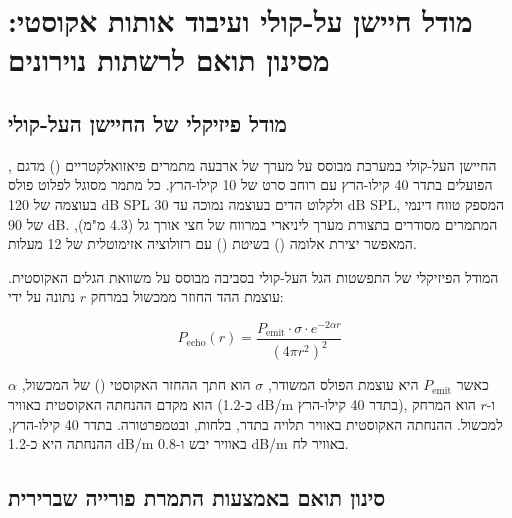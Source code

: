 

\section{מודל חיישן על-קולי ועיבוד אותות אקוסטי: מסינון תואם לרשתות נוירונים}
\label{sec:ch03_sensors}

\subsection{מודל פיזיקלי של החיישן העל-קולי}
\label{sec:ch03_physical_model}

החיישן העל-קולי במערכת מבוסס על מערך של ארבעה מתמרים פיאזואלקטריים () מדגם , הפועלים בתדר 40 קילו-הרץ עם רוחב סרט של 10 קילו-הרץ. כל מתמר מסוגל לפלוט פולס בעוצמה של 120 dB SPL ולקלוט הדים בעוצמה נמוכה עד 30 dB SPL, המספק טווח דינמי של 90 dB. המתמרים מסודרים בתצורת מערך ליניארי במרווח של חצי אורך גל (4.3 מ"מ), המאפשר יצירת אלומה () בשיטת  () עם רזולוציה אזימוטלית של 12 מעלות. \cite{CrewAIDocs}

המודל הפיזיקלי של התפשטות הגל העל-קולי בסביבה מבוסס על משוואת הגלים האקוסטית. עוצמת ההד החוזר ממכשול במרחק $r$ נתונה על ידי:

\begin{equation}
P_{\text{echo}}(r) = \frac{P_{\text{emit}} \cdot \sigma \cdot e^{-2\alpha r}}{(4\pi r^2)^2}
\label{eq:ch03_echo_power}
\end{equation}

כאשר $P_{\text{emit}}$ היא עוצמת הפולס המשודר, $\sigma$ הוא חתך ההחזר האקוסטי () של המכשול, $\alpha$ הוא מקדם ההנחתה האקוסטית באוויר (כ-1.2 dB/m בתדר 40 קילו-הרץ), ו-$r$ הוא המרחק למכשול. ההנחתה האקוסטית באוויר תלויה בתדר, בלחות, ובטמפרטורה. בתדר 40 קילו-הרץ, ההנחתה היא כ-1.2 dB/m באוויר יבש ו-0.8 dB/m באוויר לח. \cite{Rihaczek1969MatchedFilter}

\subsection{סינון תואם באמצעות התמרת פורייה שברירית}
\label{sec:ch03_matched_filter}

